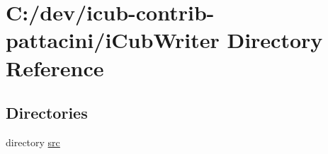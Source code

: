 \section{C\+:/dev/icub-\/contrib-\/pattacini/i\+Cub\+Writer Directory Reference}
\label{dir_e9f8f620d09566193e33eabfca0235a4}
\subsection*{Directories}
\begin{DoxyCompactItemize}
\item 
directory \hyperlink{dir_2ee165db7b46aaa62103dbb0d55277c8}{src}
\end{DoxyCompactItemize}

